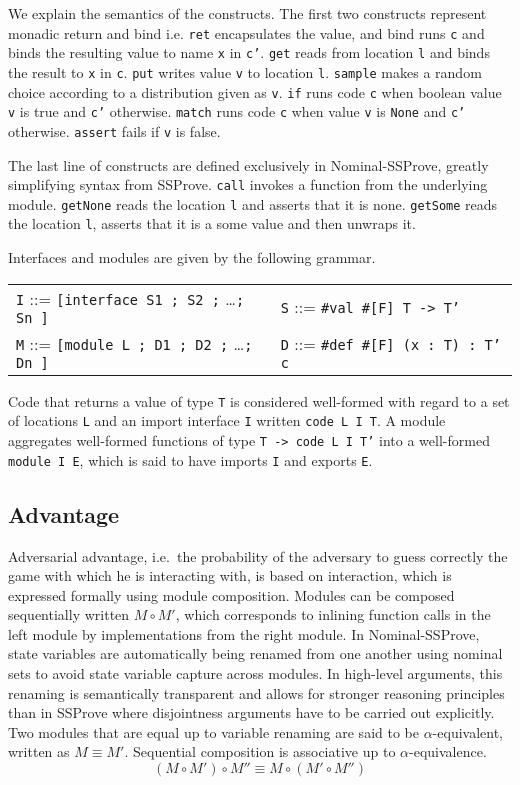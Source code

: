 \documentclass[a4paper,USenglish,cleveref, autoref]{lipics-v2021}
\newcommand{\M}[1]{\texttt{#1}}
\begin{document}
We explain the semantics of the constructs.
The first two constructs represent monadic return and bind i.e.
\M{ret} encapsulates the value, and bind runs \M{c} and binds
the resulting value to name \M{x} in \M{c'}.
\M{get} reads from location \M{l} and binds the result to \M{x} in \M{c}.
\M{put} writes value \M{v} to location \M{l}.
\M{sample} makes a random choice according to a distribution given as \M{v}.
\M{if} runs code \M{c} when boolean value \M{v} is true and \M{c'} otherwise.
\M{match} runs code \M{c} when value \M{v} is \M{None} and \M{c'} otherwise.
\M{assert} fails if \M{v} is false.

The last line of constructs are  defined exclusively in Nominal-SSProve, greatly simplifying syntax from SSProve.
\M{call} invokes a function from the underlying module.
\M{getNone} reads the location \M{l} and asserts that it is none.
\M{getSome} reads the location \M{l}, asserts that it is a some value and then unwraps it.

Interfaces and modules are given by the following grammar.

\begin{center}
\begin{tabular}{ll}
\M{I} ::= \M{[interface S1 ; S2 ;} \ldots \M{; Sn ]} &
  \M{S} ::= \texttt{\#}\M{val}\ \texttt{\#}\M{[F] T -> T'} \\
\M{M} ::= \M{[module L ; D1 ; D2 ;} \ldots \M{; Dn ]} &
  \M{D} ::= \texttt{\#}\M{def}\ \texttt{\#}\M{[F] (x : T) : T' { c }}
\end{tabular}
\end{center}

Code that returns a value of type \M{T} is considered well-formed with regard to a set of locations \M{L} and an import interface \M{I} written \texttt{code L I T}.
A module aggregates well-formed functions of type \M{T -> code L I T'} into a well-formed  \M{module I E}, which is said
to have imports \M{I} and exports \M{E}.

\subsection{Advantage}\label{sec:advantage}

Adversarial advantage, i.e.\ the probability of the adversary to guess correctly the game with which he is interacting with, is based on interaction, which is expressed formally using module composition.
Modules can be composed sequentially written $M \circ M'$, which corresponds to inlining function calls in the left module by implementations from the right module.
In Nominal-SSProve, state variables are automatically being renamed from one another using nominal sets to avoid state variable capture across modules. In high-level arguments, this renaming is semantically transparent and allows for stronger reasoning principles than in SSProve where disjointness arguments have to be carried out explicitly.
Two modules that are equal up to variable renaming are said to be $\alpha$-equivalent, written as $M \equiv M'$.
Sequential composition is associative up to $\alpha$-equivalence.
$$ (M \circ M') \circ M'' \equiv M \circ (M' \circ M'') $$
\end{document}
